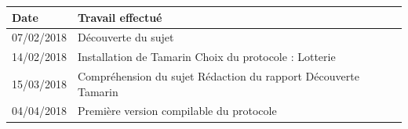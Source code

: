 \documentclass{article}
\begin{document}

\newpage
\begin{tabular}{|m{3cm}|m{7cm}}
\hline
\rowcolor{grey!40} \textbf{Date} & \textbf{Travail effectué}  \\ 
\hline 
\rowcolor{grey!10}  07/02/2018 & Découverte du sujet \\
\hline
\rowcolor{grey!10}  14/02/2018 & Installation de Tamarin \newline Choix du protocole : Lotterie \\
\hline
\rowcolor{grey!10}  15/03/2018 & Compréhension du sujet \newline Rédaction du rapport \newline Découverte Tamarin \\
\hline
\rowcolor{grey!10}  04/04/2018 & Première version compilable du protocole \\
\end{tabular}


\newpage


\end{document}
